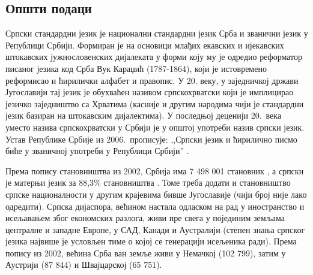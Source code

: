 \clearpage

\begin{multicols}{2}


\subsection{Општи подаци}


Српски стандардни језик је национални стандардни језик Срба и званични језик у Републици Србији. Формиран је на основици млађих екавских и ијекавских штокавских јужнословенских дијалеката у форми коју му је одредио реформатор писаног језика код Срба Вук Караџић (1787-1864), који је истовремено реформисао и ћирилички алфабет и правопис. У 20. веку,  у заједничкој држави Југославији тај језик је обухваћен називом српскохрватски који је имплицирао језичко заједништво са Хрватима (касније и другим народима чији је стандардни језик базиран на штокавским дијалектима). У последњој деценији 20.~века уместо назива српскохрватски у Србији је у општој употреби  назив српски језик. Устав Републике Србије из 2006.~прописује: ,,Српски језик и ћирилично писмо биће у званичној употреби у Републици Србији'' \cite{Ustav}.

Према попису становништва из 2002, Србија има 7 498 001 становник \cite{VJN3}, а српски је матерњи језик за 88,3\% становништва \cite{HDR}. Томе треба додати и становништво српске националности у другим крајевима бивше Југославије (чији  број није лако одредити). Српска дијаспора, већином настала одласком на рад у иностранство и исељавањем због економских разлога, живи пре свега у појединим земљама централне и западне Европе, у САД, Канади и Аустралији (степен знања српског језика највише је у\-сло\-вљен тиме о којој се генерацији исељеника ради). Према попису из 2002, већина Срба ван земље живи у Немачкој (102 799), затим у Аустрији (87 844) и Швајцарској (65 751). 



\end{multicols}

